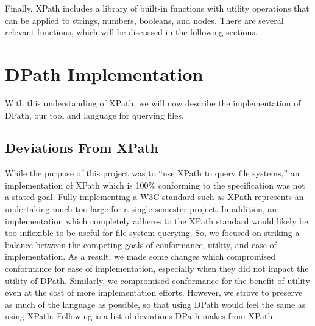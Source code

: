 \documentclass{article}
\begin{document}
Finally, XPath includes a library of built-in functions with utility operations
that can be applied to strings, numbers, booleans, and nodes. There are several
relevant functions, which will be discussed in the following sections.

\section{DPath Implementation}
\label{sec:dpath}

With this understanding of XPath, we will now describe the implementation of
DPath, our tool and language for querying files.

\subsection{Deviations From XPath}

While the purpose of this project was to ``use XPath to query file systems,'' an
implementation of XPath which is 100\% conforming to the specification was not a
stated goal. Fully implementing a W3C standard such as XPath represents an
undertaking much too large for a single semester project. In addition, an
implementation which completely adheres to the XPath standard would likely be
too inflexible to be useful for file system querying. So, we focused on
striking a balance between the competing goals of conformance, utility, and ease
of implementation. As a result, we made some changes which compromised
conformance for ease of implementation, especially when they did not impact the
utility of DPath. Similarly, we compromised conformance for the benefit of
utility even at the cost of more implementation efforts. However, we strove to
preserve as much of the language as possible, so that using DPath would feel the
same as using XPath. Following is a list of deviations DPath makes from XPath.
\end{document}
